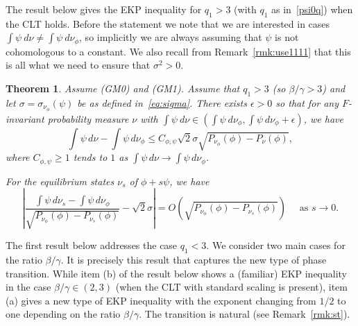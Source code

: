 \documentclass[12pt]{article}
\numberwithin{equation}{section}
\newtheorem{thm}{Theorem}[section]
\newcommand{\eps}{{\epsilon}}
\begin{document}
The result below gives the EKP inequality for $q_1>3$ (with $q_1$ as in~\eqref{psi0q}) when the CLT holds.
Before the statement we note that we are interested in cases $\int\psi~d\nu\neq \int\psi~d\nu_\phi$, so implicitly we are always assuming that $\psi$ is not cohomologous to a constant. 
We also recall from Remark~\ref{rmk:use1111} that this is all what we need to ensure that $\sigma^2>0$.

\begin{thm}\label{thm:firstmain} Assume (GM0) and (GM1).
Assume that $q_1 >3$ (so $\beta/\gamma > 3$) and let $\sigma=\sigma_{\nu_\phi}(\psi)$ be as
defined in~\eqref{eq:sigma}. There exists $\eps>0$ 
  so that for any $F$-invariant probability measure $\nu$ with 
  $\int\psi~d\nu\in \left(\int\psi~d\nu_\phi, \int\psi~d\nu_\phi+\eps\right)$, we have
 \[
\int\psi\,d\nu-\int\psi\,d\nu_{\phi} 
     \le C_{\phi, \psi}  {\sqrt 2}\sigma\sqrt{P_{\nu_\phi}(\phi)-P_\nu(\phi)},
     \] 
where $C_{\phi, \psi} \geq 1$ tends to $1$ as $\int \psi \, d\nu \to \int \psi \, d\nu_{\phi}$.     
     
 For the equilibrium states $\nu_s$ of $\phi + s\psi$, we have
    \begin{equation}\label{eq:ho}
\left| \frac{\int\psi\,d\nu_s-\int\psi\,d\nu_{\phi} }{ \sqrt{P_{\nu_\phi}(\phi)-P_{\nu_s}(\phi)}} - \sqrt 2 \sigma \right| = O\left(\sqrt{P_{\nu_\phi}(\phi)-P_{\nu_s}(\phi)}  \right) \quad \text{ as } s \to 0.
  \end{equation}
\end{thm}

The first result below addresses the case $q_1<3$. We consider two main cases for the ratio $\beta/\gamma$.
It is precisely this result that captures the new type of phase transition. While item (b) of the result below
shows a (familiar) EKP inequality in the case $\beta/\gamma\in (2,3)$ (when the CLT with standard scaling is present),
item (a) gives a new type of EKP inequality with the exponent changing from $1/2$ to one depending on the ratio $\beta/\gamma$.
The transition is natural (see Remark~\ref{rmk:st}).
\end{document}
